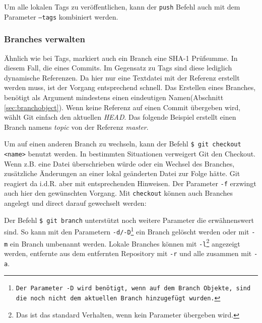 

Um alle lokalen Tags zu veröffentlichen, kann der \texttt{push} Befehl auch mit
dem Parameter \texttt{--tags} kombiniert werden.\cite[70-71,162-163]{gitosp}



\subsubsection{Branches verwalten} Ähnlich wie bei Tags, markiert auch ein
Branch eine \gls{SHA-1} Prüfsumme. In diesem Fall, die eines Commits. Im
Gegensatz zu Tags sind diese lediglich dynamische Referenzen. Da hier nur eine
Textdatei mit der Referenz erstellt werden muss, ist der Vorgang entsprechend
schnell. Das Erstellen eines Branches, benötigt als Argument mindestens einen
eindeutigen Namen(Abschnitt \ref{sec:branchobject}). Wenn keine Referenz auf
einen Commit übergeben wird, wählt Git einfach den aktuellen \textit{HEAD}.
Das folgende Beispiel erstellt einen Branch namens \textit{topic} von der
Referenz \textit{master}.



Um auf einen anderen Branch zu wechseln, kann der Befehl \texttt{\$ git checkout
<name>} benutzt werden. In bestimmten Situationen verweigert Git den Checkout.
Wenn z.B. eine Datei überschrieben würde oder ein Wechsel des Branches, zusätzliche
Änderungen an einer lokal geänderten Datei zur Folge hätte. Git reagiert da
i.d.R. aber mit entsprechenden Hinweisen. Der Parameter \texttt{-f} erzwingt
auch hier den gewünschten Vorgang. Mit \texttt{checkout} können auch Branches
angelegt und direct darauf gewechselt werden:



Der Befehl \texttt{\$ git branch} unterstützt noch weitere Parameter die
erwähnenswert sind. So kann mit den Parametern
\texttt{-d/-D}\footnote{\texttt{Der Parameter -D wird benötigt, wenn auf dem
Branch Objekte, sind die noch nicht dem aktuellen Branch hinzugefügt
wurden.\cite[67]{gitosp}}} ein Branch gelöscht werden oder mit \texttt{-m} ein
Branch umbenannt werden. Lokale Branches können mit \texttt{-l}\footnote{Das
ist das standard Verhalten, wenn kein Parameter übergeben wird.} angezeigt
werden, entfernte aus dem entfernten Repository mit \texttt{-r} und alle
zusammen mit \texttt{-a}.\cite[65-67]{gitosp}

